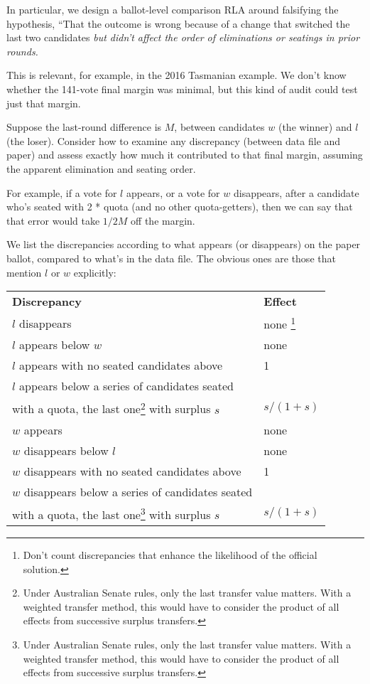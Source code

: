 \documentclass[10pt,a4paper]{article}
\begin{document}
In particular, we design a ballot-level comparison RLA around falsifying the hypothesis, ``That the outcome is wrong because of a change that switched the last two candidates \emph{but didn't affect the order of eliminations or seatings in prior rounds.}

This is relevant, for example, in the 2016 Tasmanian example.  We don't know whether the 141-vote final margin was minimal, but this kind of audit could test just that margin.

Suppose the last-round difference is $M$, between candidates $w$ (the winner) and $l$ (the loser).  Consider how to examine any discrepancy (between data file and paper) and assess exactly how much it contributed to that final margin, assuming the apparent elimination and seating order.  

For example, if a vote for $l$ appears, or a vote for $w$ disappears, after a candidate who's seated with 2 * quota (and no other quota-getters), then we can say that that error would take $1/2M$ off the margin. 

We list the discrepancies according to what appears (or disappears) on the paper ballot, compared to what's in the data file.  The obvious ones are those that mention $l$ or $w$ explicitly:

\begin{tabular}{ll}
{\bf Discrepancy} & {\bf Effect} \\

$l$ disappears & none \footnote{Don't count discrepancies that enhance the likelihood of the official solution.}\\
$l$ appears below $w$ & none \\
$l$ appears with no seated candidates above & 1 \\
$l$ appears below a series of candidates seated & \\
 with a quota, the last one\footnote{Under Australian Senate rules, only the last transfer value matters.  With a weighted transfer method, this would have to consider the product of all effects from successive surplus transfers.} with surplus $s$ & $s/(1+s)$ \\
$w$ appears & none \\
$w$ disappears below $l$ & none \\
$w$ disappears with no seated candidates above & 1 \\
$w$ disappears below a series of candidates seated & \\
 with a quota, the last one\footnote{Under Australian Senate rules, only the last transfer value matters.  With a weighted transfer method, this would have to consider the product of all effects from successive surplus transfers.} with surplus $s$ & $s/(1+s)$
\end{tabular}
\end{document}
